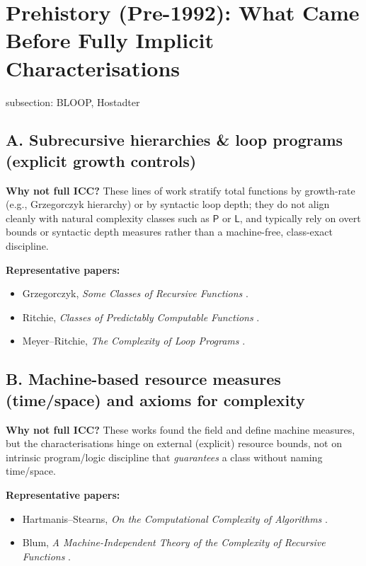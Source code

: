 
\section{Prehistory (Pre-1992): What Came Before Fully Implicit Characterisations}


subsection:
BLOOP, Hostadter


\subsection*{A. Subrecursive hierarchies \& loop programs (explicit growth controls)}
\textbf{Why not full ICC?} These lines of work stratify total functions by growth-rate
(e.g., Grzegorczyk hierarchy) or by syntactic loop depth; they do not align cleanly with
natural complexity classes such as \(\mathsf{P}\) or \(\mathsf{L}\), and typically rely on overt
bounds or syntactic depth measures rather than a machine-free, class-exact discipline.

\noindent\textbf{Representative papers:}
\begin{itemize}
  \item Grzegorczyk, \emph{Some Classes of Recursive Functions} \cite{Grzegorczyk1953}.
  \item Ritchie, \emph{Classes of Predictably Computable Functions} \cite{Ritchie1963}.
  \item Meyer--Ritchie, \emph{The Complexity of Loop Programs} \cite{MeyerRitchie1967}.
\end{itemize}

\subsection*{B. Machine-based resource measures (time/space) and axioms for complexity}
\textbf{Why not full ICC?} These works found the field and define machine measures, but
the characterisations hinge on external (explicit) resource bounds, not on intrinsic
program/logic discipline that \emph{guarantees} a class without naming time/space.

\noindent\textbf{Representative papers:}
\begin{itemize}
  \item Hartmanis--Stearns, \emph{On the Computational Complexity of Algorithms} \cite{HartmanisStearns1965}.
  \item Blum, \emph{A Machine-Independent Theory of the Complexity of Recursive Functions} \cite{Blum1967}.
\end{itemize}

